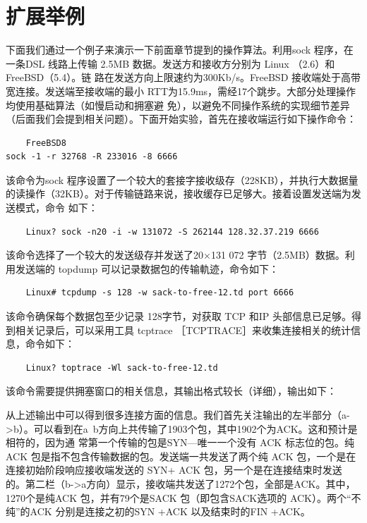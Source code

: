 \section{扩展举例}
下面我们通过一个例子来演示一下前面章节提到的操作算法。利用sock 程序，在一条DSL 线路上传输 2.5MB 数据。发送方和接收方分别为 Linux （2.6）和 FreeBSD（5.4）。链
路在发送方向上限速约为300Kb/s。FreeBSD 接收端处于高带宽连接。发送端至接收端的最小 RTT为15.9ms，需经17个跳步。大部分处理操作均使用基础算法（如慢启动和拥塞避
免），以避免不同操作系统的实现细节差异（后面我们会提到相关问题）。下面开始实验，首先在接收端运行如下操作命令：

\begin{verbatim}
    FreeBSD8
sock -1 -r 32768 -R 233016 -8 6666
\end{verbatim}

该命令为sock 程序设置了一个较大的套接字接收级存（228KB），并执行大数据量的读操作（32KB）。对于传输链路来说，接收缓存已足够大。接着设置发送端为发送模式，命令
如下：

\begin{verbatim}
    Linux? sock -n20 -i -w 131072 -S 262144 128.32.37.219 6666
\end{verbatim}

该命令选择了一个较大的发送级存并发送了20×131 072 字节（2.5MB）数据。利用发送端的 topdump 可以记录数据包的传输軌迹，命令如下：
\begin{verbatim}
    Linux# tcpdump -s 128 -w sack-to-free-12.td port 6666
\end{verbatim}

该命令确保每个数据包至少记录 128字节，对获取 TCP 和IP 头部信息已足够。得到相关记录后，可以采用工具 tcptrace ［TCPTRACE］来收集连接相关的统计信息，命令如下：
\begin{verbatim}
    Linux? toptrace -Wl sack-to-free-12.td
\end{verbatim}
该命令需要提供拥塞窗口的相关信息，其输出格式较长（详细），输出如下：

从上述输出中可以得到很多连接方面的信息。我们首先关注输出的左半部分（a->b）。可以看到在a~b方向上共传输了1903个包，其中1902个为ACK。这和预计是相符的，因为通
常第一个传输的包是SYN—唯一一个没有 ACK 标志位的包。纯ACK 包是指不包含传输数据的包。发送端一共发送了两个纯 ACK 包，一个是在连接初始阶段响应接收端发送的 SYN+
ACK 包，另一个是在连接结束时发送的。第二栏（b->a方向）显示，接收端共发送了1272个包，全部是ACK。其中，1270个是纯ACK 包，并有79个是SACK 包（即包含SACK选项的
ACK）。两个“不纯”的ACK 分别是连接之初的SYN +ACK 以及结束时的FIN +ACK。

